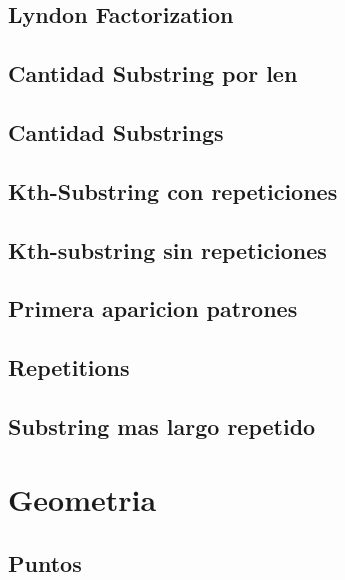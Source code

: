 \subsection{Lyndon Factorization}
\raggedbottom
\hrulefill
\subsection{Cantidad Substring por len}
\raggedbottom
\hrulefill
\subsection{Cantidad Substrings}
\raggedbottom
\hrulefill
\subsection{Kth-Substring con repeticiones}
\raggedbottom
\hrulefill
\subsection{Kth-substring sin repeticiones}
\raggedbottom
\hrulefill
\subsection{Primera aparicion patrones}
\raggedbottom
\hrulefill
\subsection{Repetitions}
\raggedbottom
\hrulefill
\subsection{Substring mas largo repetido}
\raggedbottom
\hrulefill

\section{Geometria}
\subsection{Puntos}
\raggedbottom
\hrulefill
